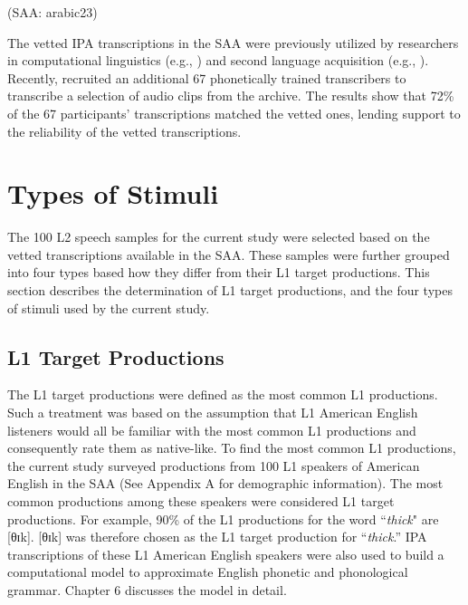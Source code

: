\bigskip
{} (SAA: arabic23)
\bigskip

The vetted IPA transcriptions in the SAA were previously utilized by researchers in computational linguistics (e.g., \citealp{Frost_2013, Minematsu_2014}) and second language acquisition (e.g., \citealp{Klein_2011}). Recently, \citet{Weinberger_2019} recruited an additional 67 phonetically trained transcribers to transcribe a selection of audio clips from the archive. The results show that 72\% of the 67 participants’ transcriptions matched the vetted ones, lending support to the reliability of the vetted transcriptions. 

\section{Types of Stimuli}

The 100 L2 speech samples for the current study were selected based on the vetted transcriptions available in the SAA. These samples were further grouped into four types based how they differ from their L1 target productions. This section describes the determination of L1 target productions, and the four types of stimuli used by the current study.

\subsection{L1 Target Productions}

The L1 target productions were defined as the most common L1 productions. Such a treatment was based on the assumption that L1 American English listeners would all be familiar with the most common L1 productions and consequently rate them as native-like. To find the most common L1 productions, the current study surveyed productions from 100 L1 speakers of American English in the SAA (See Appendix A for demographic information). The most common productions among these speakers were considered L1 target productions. For example, 90\% of the L1 productions for the word ``\textit{thick}" are [θɪk]. [θɪk] was therefore chosen as the L1 target production for “\textit{thick}.” IPA transcriptions of these L1 American English speakers were also used to build a computational model to approximate English phonetic and phonological grammar. Chapter 6 discusses the model in detail.

